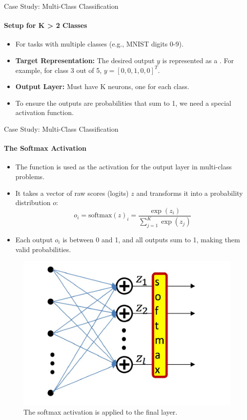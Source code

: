 \begin{frame}{Case Study: Multi-Class Classification}
    \framesubtitle{Setup for K > 2 Classes}
    \begin{itemize}
        \item For tasks with multiple classes (e.g., MNIST digits 0-9).
        \item \textbf{Target Representation:} The desired output $y$ is represented as a . For example, for class 3 out of 5, $y = [0, 0, 1, 0, 0]^T$.
        \item \textbf{Output Layer:} Must have K neurons, one for each class.
        \item To ensure the outputs are probabilities that sum to 1, we need a special activation function.
    \end{itemize}
\end{frame}

\begin{frame}{Case Study: Multi-Class Classification}
    \framesubtitle{The Softmax Activation}
    \begin{itemize}
        \item The  function is used as the activation for the output layer in multi-class problems.
        \item It takes a vector of raw scores (logits) $z$ and transforms it into a probability distribution $o$:
        \[
            o_i = \text{softmax}(z)_i = \frac{\exp(z_i)}{\sum_{j=1}^{K} \exp(z_j)}
        \]
        \item Each output $o_i$ is between 0 and 1, and all outputs sum to 1, making them valid probabilities.
    \end{itemize}
    \begin{figure}
        \centering
        \includegraphics[width=0.5\linewidth]{images/softmax_layer.png}
        \caption{The softmax activation is applied to the final layer.}
    \end{figure}
\end{frame}

